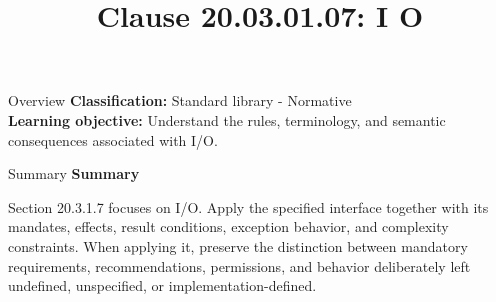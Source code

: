 \documentclass[10pt,letterpaper]{article}
\title{Clause 20.03.01.07: I O}
\author{}
\date{}
\begin{document}
\maketitle
\begin{CornellOverviewBox}{Overview}
\textbf{Classification:} Standard library - Normative\\[2pt]
\textbf{Learning objective:} Understand the rules, terminology, and semantic consequences associated with I/O.
\end{CornellOverviewBox}\begin{CornellSummaryBox}{Summary}
{\sffamily\bfseries\color{Accent} Summary}\par\vspace{3pt}Section 20.3.1.7 focuses on I/O. Apply the specified interface together with its mandates, effects, result conditions, exception behavior, and complexity constraints. When applying it, preserve the distinction between mandatory requirements, recommendations, permissions, and behavior deliberately left undefined, unspecified, or implementation-defined.
\end{CornellSummaryBox}
\end{document}
